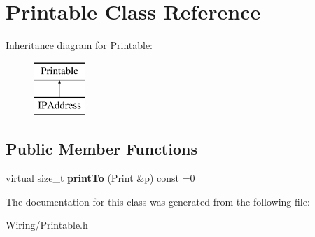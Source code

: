 \hypertarget{class_printable}{}\section{Printable Class Reference}
\label{class_printable}
Inheritance diagram for Printable\+:\begin{figure}[H]
\begin{center}
\leavevmode
\includegraphics[height=2.000000cm]{class_printable}
\end{center}
\end{figure}
\subsection*{Public Member Functions}
\begin{DoxyCompactItemize}
\item 
\hypertarget{class_printable_a2c5776bc55c0a3a5675bba9d4d8e3681}{}virtual size\+\_\+t {\bfseries print\+To} (Print \&p) const =0\label{class_printable_a2c5776bc55c0a3a5675bba9d4d8e3681}

\end{DoxyCompactItemize}


The documentation for this class was generated from the following file\+:\begin{DoxyCompactItemize}
\item 
Wiring/Printable.\+h\end{DoxyCompactItemize}

